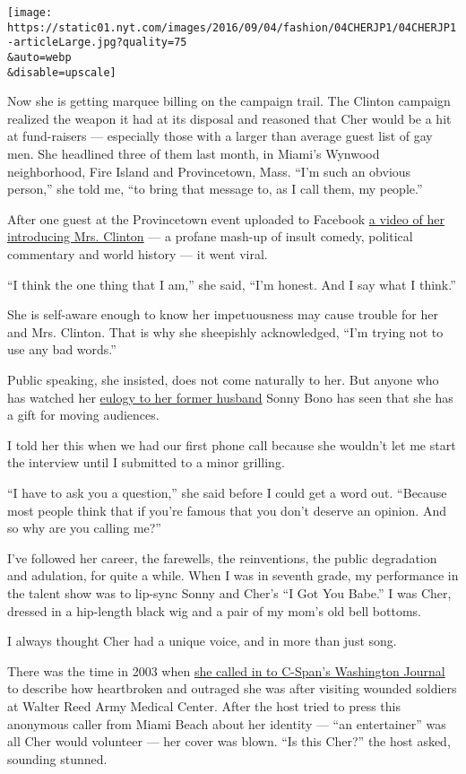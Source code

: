 \texttt{[image: https://static01.nyt.com/images/2016/09/04/fashion/04CHERJP1/04CHERJP1-articleLarge.jpg?quality=75\\\&auto=webp\\\&disable=upscale]}

Now she is getting marquee billing on the campaign trail. The Clinton
campaign realized the weapon it had at its disposal and reasoned that
Cher would be a hit at fund-raisers --- especially those with a larger
than average guest list of gay men. She headlined three of them last
month, in Miami's Wynwood neighborhood, Fire Island and Provincetown,
Mass. ``I'm such an obvious person,'' she told me, ``to bring that
message to, as I call them, my people.''

After one guest at the Provincetown event uploaded to Facebook
\href{http://www.nytimes.com/2016/08/24/us/politics/cher-hillary-clinton-donald-trump.html}{a
video of her introducing Mrs. Clinton} --- a profane mash-up of insult
comedy, political commentary and world history --- it went viral.

``I think the one thing that I am,'' she said, ``I'm honest. And I say
what I think.''

She is self-aware enough to know her impetuousness may cause trouble for
her and Mrs. Clinton. That is why she sheepishly acknowledged, ``I'm
trying not to use any bad words.''

Public speaking, she insisted, does not come naturally to her. But
anyone who has watched her
\href{https://www.youtube.com/watch?v=gdHdd5ejAeY}{eulogy to her former
husband} Sonny Bono has seen that she has a gift for moving audiences.

I told her this when we had our first phone call because she wouldn't
let me start the interview until I submitted to a minor grilling.

``I have to ask you a question,'' she said before I could get a word
out. ``Because most people think that if you're famous that you don't
deserve an opinion. And so why are you calling me?''

I've followed her career, the farewells, the reinventions, the public
degradation and adulation, for quite a while. When I was in seventh
grade, my performance in the talent show was to lip-sync Sonny and
Cher's ``I Got You Babe.'' I was Cher, dressed in a hip-length black wig
and a pair of my mom's old bell bottoms.

I always thought Cher had a unique voice, and in more than just song.

There was the time in 2003 when
\href{https://www.c-span.org/video/?c4532037/cher-calls-c-span}{she
called in to C-Span's Washington Journal} to describe how heartbroken
and outraged she was after visiting wounded soldiers at Walter Reed Army
Medical Center. After the host tried to press this anonymous caller from
Miami Beach about her identity --- ``an entertainer'' was all Cher would
volunteer --- her cover was blown. ``Is this Cher?'' the host asked,
sounding stunned.

